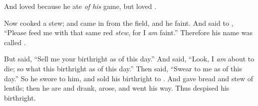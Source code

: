 \bverse And \Isaac loved \Esau because he ate \textit{of his} game, but \Rebekah loved \Jacob.


\bverse Now \Jacob cooked a stew; and \Esau came in from the field, and he \was faint.
\bverse And \Esau said to \Jacob, ``Please feed me with that same red \textit{stew}, for I \textit{am} faint.'' Therefore his name was called .

\bverse But \Jacob said, ``Sell me your birthright as of this day.''
\bverse And \Esau said, ``Look, I \textit{am} about to die; so what \is this birthright as of this day.''
\bverse Then \Jacob said, ``Swear to me as of this day.'' So he swore to him, and sold his birthright to \Jacob.
\bverse And \Jacob gave \Esau bread and stew of lentils; then he are and drank, arose, and went his way. Thus \Esau despised his birthright.

